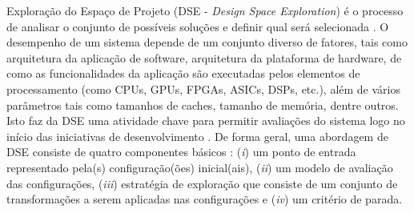 \documentclass[tese-proposta,nocipinfo]{texufpel}
\begin{document}
Exploração do Espaço de Projeto (DSE - \textit{Design Space Exploration}) é o processo de analisar o conjunto de possíveis soluções e definir qual será selecionada \cite{marwedel2006embedded}. O desempenho de um sistema depende de um conjunto diverso de fatores, tais como arquitetura da aplicação de software, arquitetura da plataforma de hardware, de como as funcionalidades da aplicação são executadas pelos elementos de processamento (como CPUs, GPUs, FPGAs, ASICs, DSPs, etc.), além de vários parâmetros tais como tamanhos de caches, tamanho de memória, dentre outros. Isto faz da DSE uma atividade chave para permitir avaliações do sistema logo no início das iniciativas de desenvolvimento \cite{Herrera201455}. De forma geral, uma abordagem de DSE consiste de quatro componentes básicos \cite{Ascia2011382}: (\textit{i}) um ponto de entrada representado pela(s) configuração(ões) inicial(ais), (\textit{ii}) um modelo de avaliação das configurações, (\textit{iii}) estratégia de exploração que consiste de um conjunto de transformações a serem aplicadas nas configurações e (\textit{iv}) um critério de parada. 
\end{document}
